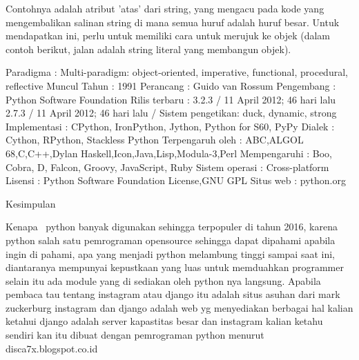 \vspace{14pt}
\noindent 
{\fontsize{14pt}{14pt}\selectfont Contohnya adalah atribut 'atas' dari string, yang mengacu pada kode yang mengembalikan salinan string di mana semua huruf adalah huruf besar. Untuk mendapatkan ini, perlu untuk memiliki cara untuk merujuk ke objek (dalam contoh berikut, jalan adalah string literal yang membangun objek). \\} \par
\vspace{14pt}
\vspace{14pt}
\noindent 
{\fontsize{14pt}{14pt}\selectfont Paradigma : Multi-paradigm: object-oriented, imperative, functional, procedural, reflective\vspace{\baselineskip}
Muncul Tahun : 1991\vspace{\baselineskip}
Perancang : Guido van Rossum\vspace{\baselineskip}
Pengembang : Python Software Foundation\vspace{\baselineskip}
Rilis terbaru : 3.2.3 / 11 April 2012; 46 hari lalu 2.7.3 / 11 April 2012; 46 hari lalu /\vspace{\baselineskip}
Sistem pengetikan: duck, dynamic, strong\vspace{\baselineskip}
Implementasi : CPython, IronPython, Jython, Python for S60, PyPy\vspace{\baselineskip}
Dialek : Cython, RPython, Stackless Python\vspace{\baselineskip}
Terpengaruh oleh : ABC,ALGOL 68,C,C++,Dylan Haskell,Icon,Java,Lisp,Modula-3,Perl\vspace{\baselineskip}
Mempengaruhi : Boo, Cobra, D, Falcon, Groovy, JavaScript, Ruby\vspace{\baselineskip}
Sistem operasi : Cross-platform\vspace{\baselineskip}
Lisensi : Python Software Foundation License,GNU GPL\vspace{\baselineskip}
Situs web : python.org \\} \par
\vspace{14pt}
\noindent 
{\fontsize{14pt}{14pt}\selectfont Kesimpulan  \\} \par
\noindent 
{\fontsize{14pt}{14pt}\selectfont Kenapa~ python banyak digunakan sehingga terpopuler di tahun 2016, karena python salah satu pemrograman opensource sehingga dapat dipahami apabila ingin di pahami, apa yang menjadi python melambung tinggi sampai saat ini, diantaranya mempunyai kepustkaan yang luas untuk memduahkan programmer selain itu ada module yang di sediakan oleh python nya langsung. Apabila pembaca tau tentang instagram atau django itu adalah situs asuhan dari mark zuckerburg instagram dan django adalah web yg menyediakan berbagai hal kalian ketahui django adalah server kapastitas besar dan instagram kalian ketahu sendiri kan itu dibuat dengan pemrograman python menurut disca7x.blogspot.co.id \\} \par
\vspace{14pt}
\vspace{14pt}
\vspace{14pt}
\vspace{12pt}
